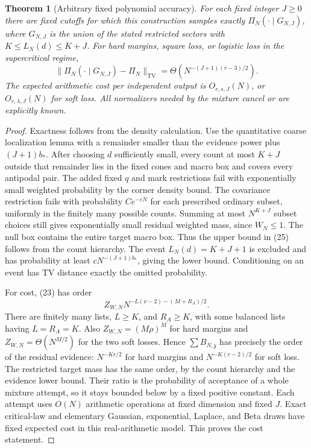 \documentclass[11pt]{article}
\newtheorem{theorem}{Theorem}\newtheorem{lemma}[theorem]{Lemma}
\newcommand{\TV}{\mathrm{TV}}\newcommand{\one}{\mathbf1}
\begin{document}
\begin{theorem}[Arbitrary fixed polynomial accuracy]\label{thm:multisector}
For each fixed integer $J\ge0$ there are fixed cutoffs for which this
construction samples exactly $\Pi_N(\cdot\mid G_{N,J})$, where
$G_{N,J}$ is the union of the stated restricted sectors with
$K\le L_N(d)\le K+J$. For hard margins, square loss, or logistic loss
in the supercritical regime,
\[
 \|\Pi_N(\cdot\mid G_{N,J})-\Pi_N\|_{\TV}
                  =\Theta(N^{-(J+1)(r-3)/2}).           \tag{25}
\]
The expected arithmetic cost per independent output is
$O_{r,s,J}(N)$, or $O_{r,\lambda,J}(N)$ for soft loss. All normalizers
needed by the mixture cancel or are explicitly known.
\end{theorem}
\begin{proof}
Exactness follows from the density calculation. Use the quantitative
coarse localization lemma with a remainder smaller than the evidence
power plus $(J+1)b_*$. After choosing $d$ sufficiently small, every
count at most $K+J$ outside that remainder lies in the fixed cones and
macro box and covers every antipodal pair. The added fixed $q$ and
mark restrictions fail with exponentially small weighted probability
by the corner density bound. The covariance restriction fails with
probability $Ce^{-cN}$ for each prescribed ordinary subset, uniformly
in the finitely many possible counts. Summing at most $N^{K+J}$ subset
choices still gives exponentially small residual weighted mass, since
$W_N\le1$. The null box contains the entire target macro box.
Thus the upper bound in (25) follows from the count hierarchy. The event
$L_N(d)=K+J+1$ is excluded and has probability at least
$cN^{-(J+1)b_*}$, giving the lower bound. Conditioning on an event has
TV distance exactly the omitted probability.

For cost, (23) has order
\[
 Z_{W,N}N^{-L(\nu-2)-(M+R_A)/2}.                       \tag{26}
\]
There are finitely many lists, $L\ge K$, and $R_A\ge K$, with some
balanced lists having $L=R_A=K$. Also $Z_{W,N}=(M\rho)^M$ for hard
margins and $Z_{W,N}=\Theta(N^{M/2})$ for the two soft losses. Hence
$\sum B_{N,\mathfrak z}$ has precisely the order of the residual
evidence: $N^{-Kr/2}$ for hard margins and $N^{-K(r-2)/2}$ for soft
loss. The restricted target mass has the same order, by the count
hierarchy and the evidence lower bound. Their ratio is the probability
of acceptance of a whole mixture attempt, so it stays bounded below by
a fixed positive constant. Each attempt uses $O(N)$ arithmetic operations
at fixed dimension and fixed $J$. Exact critical-law and elementary
Gaussian, exponential, Laplace, and Beta draws have fixed expected cost
in this real-arithmetic model. This proves the cost statement.
\end{proof}
\end{document}

